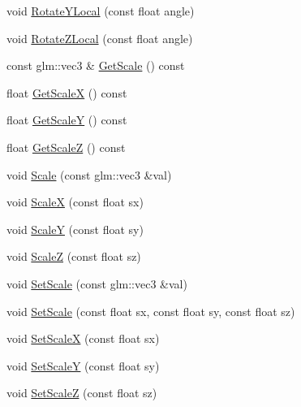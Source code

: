 \begin{DoxyCompactItemize}
\item 
void \mbox{\hyperlink{classec_1_1_transform3_d_a593767a5127e4156c309b3613a162b42}{Rotate\+Y\+Local}} (const float angle)
\item 
void \mbox{\hyperlink{classec_1_1_transform3_d_aba0aba873f12438d20f059bd86702135}{Rotate\+Z\+Local}} (const float angle)
\item 
const glm\+::vec3 \& \mbox{\hyperlink{classec_1_1_transform3_d_a8819e33e87e8a8cf0086c156b0072a4d}{Get\+Scale}} () const
\item 
float \mbox{\hyperlink{classec_1_1_transform3_d_a34c610a94a2802100447d053a7866b85}{Get\+ScaleX}} () const
\item 
float \mbox{\hyperlink{classec_1_1_transform3_d_abfa421cde566209e669eba461cdafb16}{Get\+ScaleY}} () const
\item 
float \mbox{\hyperlink{classec_1_1_transform3_d_ae4c302baa33386b27eecb1cd4c627573}{Get\+ScaleZ}} () const
\item 
void \mbox{\hyperlink{classec_1_1_transform3_d_a6f6909d1f35cc5c4d4340e6fe56d5e4d}{Scale}} (const glm\+::vec3 \&val)
\item 
void \mbox{\hyperlink{classec_1_1_transform3_d_a17289ae542625db691f2d4944c8213fb}{ScaleX}} (const float sx)
\item 
void \mbox{\hyperlink{classec_1_1_transform3_d_a8b85b17f0879d8f5f0f14746d6a13f51}{ScaleY}} (const float sy)
\item 
void \mbox{\hyperlink{classec_1_1_transform3_d_aabfade728cf9193d14ab5e726c8ddd0f}{ScaleZ}} (const float sz)
\item 
void \mbox{\hyperlink{classec_1_1_transform3_d_ac60d767a4f53241ef68726530da0b984}{Set\+Scale}} (const glm\+::vec3 \&val)
\item 
void \mbox{\hyperlink{classec_1_1_transform3_d_ac3a8b4e7a97700c4761bfadbd6a6b9ec}{Set\+Scale}} (const float sx, const float sy, const float sz)
\item 
void \mbox{\hyperlink{classec_1_1_transform3_d_ae846994da07971f9d56b33d29cd65088}{Set\+ScaleX}} (const float sx)
\item 
void \mbox{\hyperlink{classec_1_1_transform3_d_a2fc713c7032ef473b7c6cc73e323e54f}{Set\+ScaleY}} (const float sy)
\item 
void \mbox{\hyperlink{classec_1_1_transform3_d_a7e6dcd189fb5e4300e63a6eaeb20eece}{Set\+ScaleZ}} (const float sz)
\end{DoxyCompactItemize}
